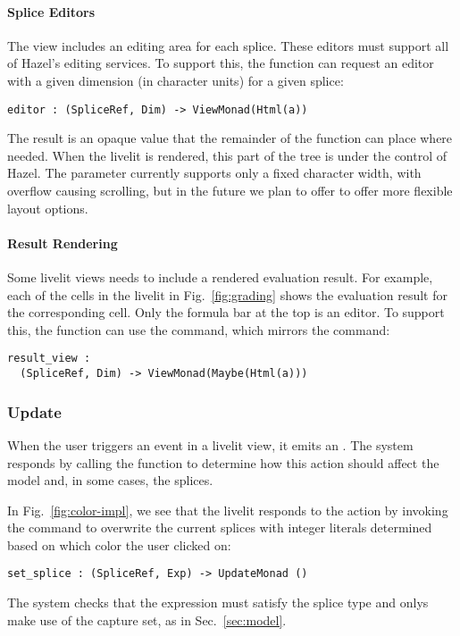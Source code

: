 \paragraph{Splice Editors}
The view includes an editing area for each splice. These editors must support all of 
Hazel's editing services. To support this, the  function
can request an editor with a given dimension (in character units) for a given splice:
\begin{lstlisting}[numbers=none]
editor : (SpliceRef, Dim) -> ViewMonad(Html(a))
\end{lstlisting}
The result is an opaque  value that the remainder of the function 
can place where needed. When the livelit is rendered, this part of the tree is 
under the control of Hazel. The  parameter currently supports only a fixed
character width, with overflow causing scrolling, but in the future we plan to offer 
to offer more flexible layout options.

\paragraph{Result Rendering}
Some livelit views needs to include 
a rendered evaluation result. For example, each of the cells in the 
livelit in Fig.~\ref{fig:grading} shows the evaluation result for the corresponding 
cell. Only the formula bar at the top is an editor. To support this, the 
function can use the  command, which mirrors the  command:
\begin{lstlisting}[numbers=none]
result_view : 
  (SpliceRef, Dim) -> ViewMonad(Maybe(Html(a)))
\end{lstlisting}


\subsubsection{Update}\label{sec:def-update}
When the user triggers an event in a livelit view, it emits an .
The system responds by calling the  function to determine how 
this action should affect the model and, in some cases, the splices. 


In Fig.~\ref{fig:color-impl}, we see that the  livelit responds to 
the  action by invoking the  command to overwrite 
the current splices with integer literals determined based on which color the user
clicked on:
\begin{lstlisting}[numbers=none]
  set_splice : (SpliceRef, Exp) -> UpdateMonad ()
\end{lstlisting}
The system checks that the expression must satisfy the splice type 
and onlys make use of the capture set, as in Sec.~\ref{sec:model}.

